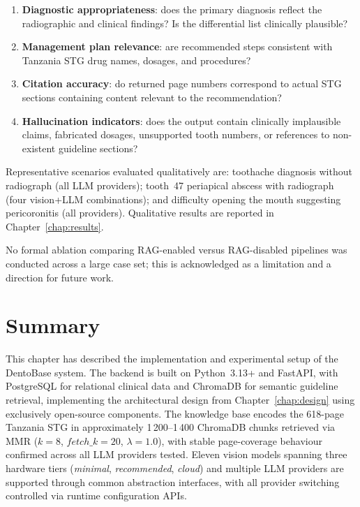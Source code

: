 \documentclass[12pt,a4paper]{report}
\begin{document}
\begin{enumerate}
  \item \textbf{Diagnostic appropriateness}: does the primary diagnosis
        reflect the radiographic and clinical findings?  Is the
        differential list clinically plausible?
  \item \textbf{Management plan relevance}: are recommended steps
        consistent with Tanzania STG drug names, dosages, and procedures?
  \item \textbf{Citation accuracy}: do returned page numbers correspond
        to actual STG sections containing content relevant to the
        recommendation?
  \item \textbf{Hallucination indicators}: does the output contain
        clinically implausible claims, fabricated dosages, unsupported
        tooth numbers, or references to non-existent guideline sections?
\end{enumerate}

Representative scenarios evaluated qualitatively are: toothache
diagnosis without radiograph (all LLM providers); tooth~47 periapical
abscess with radiograph (four vision+LLM combinations); and difficulty
opening the mouth suggesting pericoronitis (all providers).
Qualitative results are reported in Chapter~\ref{chap:results}.

No formal ablation comparing RAG-enabled versus RAG-disabled pipelines
was conducted across a large case set; this is acknowledged as a
limitation and a direction for future work.

\section{Summary}
\label{sec:ch4_summary}

This chapter has described the implementation and experimental setup of
the DentoBase system.  The backend is built on Python~3.13+ and FastAPI,
with PostgreSQL for relational clinical data and ChromaDB for semantic
guideline retrieval, implementing the architectural design from
Chapter~\ref{chap:design} using exclusively open-source components.  The knowledge base encodes
the 618-page Tanzania STG in approximately 1\,200--1\,400 ChromaDB
chunks retrieved via MMR ($k{=}8$, $\mathit{fetch\_k}{=}20$,
$\lambda{=}1.0$), with stable page-coverage behaviour confirmed across
all LLM providers tested.  Eleven vision models spanning three hardware
tiers (\textit{minimal}, \textit{recommended}, \textit{cloud}) and
multiple LLM providers are supported through common abstraction
interfaces, with all provider switching controlled via runtime
configuration APIs.
\end{document}
